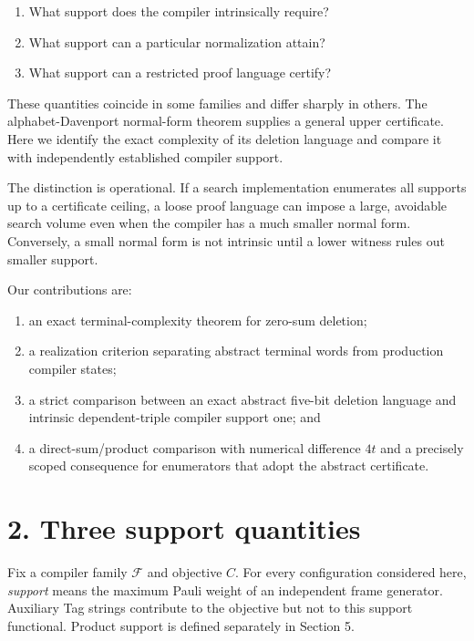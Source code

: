 \documentclass[
  11pt,
]{article}
\providecommand{\tightlist}{%
  \setlength{\itemsep}{0pt}\setlength{\parskip}{0pt}}
\begin{document}
\begin{enumerate}
\def\labelenumi{\arabic{enumi}.}
\tightlist
\item
  What support does the compiler intrinsically require?
\item
  What support can a particular normalization attain?
\item
  What support can a restricted proof language certify?
\end{enumerate}

These quantities coincide in some families and differ sharply in others.
The alphabet-Davenport normal-form theorem supplies a general upper
certificate. Here we identify the exact complexity of its deletion
language and compare it with independently established compiler support.

The distinction is operational. If a search implementation enumerates
all supports up to a certificate ceiling, a loose proof language can
impose a large, avoidable search volume even when the compiler has a
much smaller normal form. Conversely, a small normal form is not
intrinsic until a lower witness rules out smaller support.

Our contributions are:

\begin{enumerate}
\def\labelenumi{\arabic{enumi}.}
\tightlist
\item
  an exact terminal-complexity theorem for zero-sum deletion;
\item
  a realization criterion separating abstract terminal words from
  production compiler states;
\item
  a strict comparison between an exact abstract five-bit deletion
  language and intrinsic dependent-triple compiler support one; and
\item
  a direct-sum/product comparison with numerical difference \(4t\) and a
  precisely scoped consequence for enumerators that adopt the abstract
  certificate.
\end{enumerate}

\hypertarget{three-support-quantities}{%
\section{2. Three support quantities}\label{three-support-quantities}}

Fix a compiler family \(\mathcal F\) and objective \(C\). For every
configuration considered here, \emph{support} means the maximum Pauli
weight of an independent frame generator. Auxiliary Tag strings
contribute to the objective but not to this support functional. Product
support is defined separately in Section 5.
\end{document}
